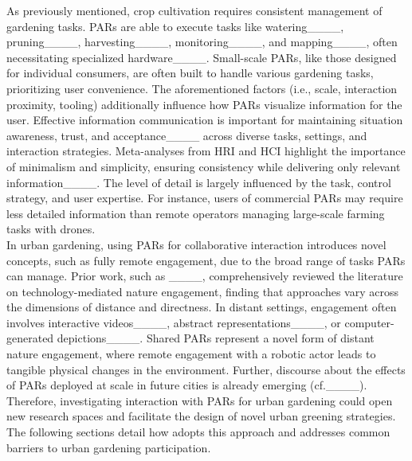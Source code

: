 As previously mentioned, crop cultivation requires consistent management of gardening tasks. PARs are able to execute tasks like watering____, pruning____, harvesting____, monitoring____, and mapping____, often necessitating specialized hardware____. Small-scale PARs, like those designed for individual consumers, are often built to handle various gardening tasks, prioritizing user convenience. The aforementioned factors (i.e., scale, interaction proximity, tooling) additionally influence how PARs visualize information for the user. Effective information communication is important for maintaining situation awareness, trust, and acceptance____ across diverse tasks, settings, and interaction strategies. Meta-analyses from HRI and HCI highlight the importance of minimalism and simplicity, ensuring consistency while delivering only relevant information____. The level of detail is largely influenced by the task, control strategy, and user expertise. For instance, users of commercial PARs may require less detailed information than remote operators managing large-scale farming tasks with drones.\\ 

In urban gardening, using PARs for collaborative interaction introduces novel concepts, such as fully remote engagement, due to the broad range of tasks PARs can manage. Prior work, such as ____, comprehensively reviewed the literature on technology-mediated nature engagement, finding that approaches vary across the dimensions of distance and directness. In distant settings, engagement often involves interactive videos____, abstract representations____, or computer-generated depictions____. Shared PARs represent a novel form of distant nature engagement, where remote engagement with a robotic actor leads to tangible physical changes in the environment. Further, discourse about the effects of PARs deployed at scale in future cities is already emerging (cf.____). Therefore, investigating interaction with PARs for urban gardening could open new research spaces and facilitate the design of novel urban greening strategies. The following sections detail how \system adopts this approach and addresses common barriers to urban gardening participation.